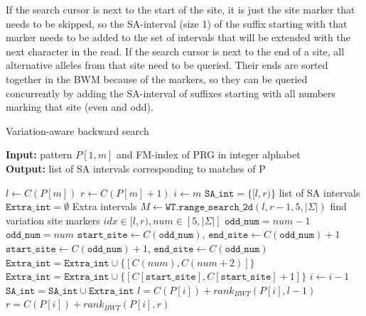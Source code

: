 \documentclass[runningheads,a4paper]{llncs}
\begin{document}
If the search cursor is next to the start of the site, it is just the site marker that needs to be skipped, so the SA-interval (size 1) of the suffix starting with that marker needs to be added to the set of intervals that will be extended with the next character in the read. If the search cursor is next to the end of a site, all alternative alleles from that site need to be queried. Their ends are sorted together in the BWM because of the markers, so they can be queried concurrently by adding the SA-interval of suffixes starting with all numbers marking that site (even and odd). 



\begin{algorithm}
\caption{Variation-aware backward search} \label{bsearch}
\textbf{Input:} \textrm{pattern} $P[1,m]$ \textrm{and FM-index of PRG in integer alphabet}\\
\textbf{Output:} \textrm{list of SA intervals corresponding to matches of P} 
\begin{algorithmic}[1]
\State $l \gets C(P[m])$
\State $r \gets C(P[m]+1)$
\State $i \gets m$
\State $\texttt{SA\char`_int}=\{[l,r)\}$ \Comment list of SA intervals
\State $\texttt{Extra\char`_int}=\emptyset$   \Comment Extra intervals
\ForAll {$[l,r) \in \texttt{SA\char`_int}$} 
\State $M \gets \texttt{WT.range\char`_search\char`_2d} (l,r-1,5,|\Sigma|)$ \Comment find variation site markers
  \Comment $ idx\in [l,r), num\in[5,|\Sigma|]$
\State $\texttt{odd\char`_num}=num-1$
\Else
\State $\texttt{odd\char`_num}=num$
\EndIf
{}
\State $\texttt{start\char`_site} \gets C(\texttt{odd\char`_num})$, $\texttt{end\char`_site} \gets C(\texttt{odd\char`_num})+1$
\Else 
\State $\texttt{start\char`_site} \gets C(\texttt{odd\char`_num})+1$, $\texttt{end\char`_site} \gets C(\texttt{odd\char`_num})$
\EndIf
{}
\State $\texttt{Extra\char`_int}=\texttt{Extra\char`_int} \cup \{[C(num),C(num+2)]\}$
\Else
\State $\texttt{Extra\char`_int}=\texttt{Extra\char`_int} \cup \{[C[\texttt{start\char`_site}], C[\texttt{start\char`_site}]+1]\}$
\EndIf
\EndFor
\EndFor
\State $i \gets i-1$
\State $\texttt{SA\char`_int}=\texttt{SA\char`_int} \cup \texttt{Extra\char`_int}$
\ForAll {$[l,r) \in \texttt{SA\char`_int}$} 
\State $l=C(P[i])+rank_{BWT}(P[i],l-1)$
\State $r=C(P[i])+rank_{BWT}(P[i],r)$
\EndFor
\EndWhile
\end {algorithmic}
\end{algorithm}
\end{document}
